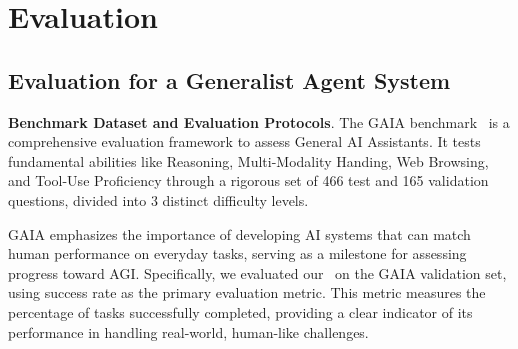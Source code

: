 \section{Evaluation}

\subsection{Evaluation for a Generalist Agent System}
\textbf{Benchmark Dataset and Evaluation Protocols}.
The GAIA benchmark~\cite{gaia} is a comprehensive evaluation framework to assess General AI Assistants. It tests fundamental abilities like Reasoning, Multi-Modality Handing, Web Browsing, and Tool-Use Proficiency through a rigorous set of 466 test and 165 validation questions, divided into 3 distinct difficulty levels.

GAIA emphasizes the importance of developing AI systems that can match human performance on everyday tasks, serving as a milestone for assessing progress toward AGI. Specifically, we evaluated our \model\ on the GAIA validation set, using success rate as the primary evaluation metric. This metric measures the percentage of tasks successfully completed, providing a clear indicator of its performance in handling real-world, human-like challenges.
